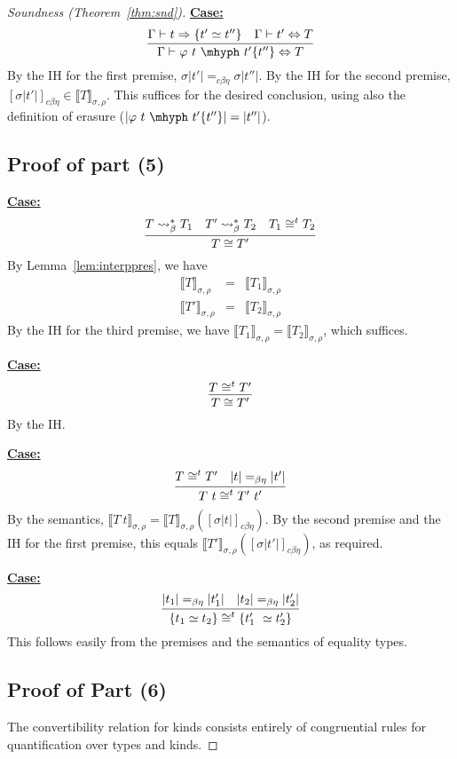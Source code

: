 \documentclass{article}
\newcommand{\interp}[1]{\llbracket #1 \rrbracket}
\newcommand{\tpsynth}[0]{\Rightarrow}
\newcommand{\cbe}[0]{c\beta\eta}
\newcommand{\startcase}[1]{\vspace{#1} \noindent\textbf{\underline{Case:}}}
\begin{document}
\begin{proof}[Soundness (Theorem~\ref{thm:snd})]
\startcase{.2cm}
\[
    \infer{\Gamma\vdash \varphi\ t\ \mhyph\ t'\{t''\} \Leftrightarrow T}
          {\Gamma\vdash t\tpsynth \{t'\simeq t''\} & \Gamma\vdash t' \Leftrightarrow T}  
\]
By the IH for the first premise, $\sigma|t'| =_{\cbe} \sigma|t''|$.  By the IH for the second
premise, $[\sigma|t'|]_{\cbe}\in\interp{T}_{\sigma,\rho}$.  This suffices for the desired conclusion,
using also the definition of erasure ($|\varphi\ t\ \mhyph\ t'\{t''\}| = |t''|$).

\subsection*{Proof of part (5) }



\startcase{.2cm}
\[
    \infer{T \cong T'}{T \leadsto^*_\beta T_1 & T' \leadsto^*_\beta T_2 & T_1\cong^t T_2}  
\]
By Lemma~\ref{lem:interppres}, we have
\[
\begin{array}{lll}
  \interp{T}_{\sigma,\rho} & = & \interp{T_1}_{\sigma,\rho}\\
  \interp{T'}_{\sigma,\rho} & = & \interp{T_2}_{\sigma,\rho}
\end{array}
\]
By the IH for the third premise, we have $\interp{T_1}_{\sigma,\rho} = \interp{T_2}_{\sigma,\rho}$,
which suffices.

\startcase{.2cm}
\[
    \infer{T \cong T'}{T \cong^t T'} 
\]
By the IH.

\startcase{.2cm}
\[
    \infer{T\ t \cong^t T'\ t'}{T \cong^t T' & |t| =_{\beta\eta} |t'|}
\]
By the semantics, $\interp{T\ t}_{\sigma,\rho} =
\interp{T}_{\sigma,\rho}([\sigma|t|]_{\cbe})$.  By the second premise
and the IH for the first premise, this equals
$\interp{T'}_{\sigma,\rho}([\sigma|t'|]_{\cbe})$, as required.

\startcase{.2cm}
\[
    \infer{\{ t_1 \simeq t_2 \} \cong^t \{ t_1'\ \simeq t_2' \}}{|t_1| =_{\beta\eta} |t_1'| & |t_2| =_{\beta\eta} |t_2'|}
\]
This follows easily from the premises and the semantics of equality types.

\subsection*{Proof of Part (6)}

The convertibility relation for kinds consists entirely of congruential rules
for quantification over types and kinds.

\end{proof}
\end{document}
